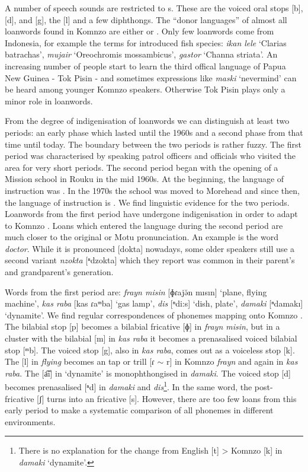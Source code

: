 A number of speech sounds are restricted to s. These are the voiced oral stops [b], [d], and [g], the   [l] and a few diphthongs. The ``donor languages'' of almost all loanwords found in Komnzo are either  or . Only few loanwords come from  Indonesia, for example the terms for introduced fish species: \emph{ikan lele} `Clarias batrachas', \emph{mujair} `Oreochromis mossambicus', \emph{gastor} `Channa striata'. An increasing number of people start to learn the third offical language of Papua New Guinea - Tok Pisin - and sometimes expressions like \emph{maski} `nevermind' can be heard among younger Komnzo speakers. Otherwise Tok Pisin plays only a minor role in loanwords.

From the degree of indigenisation of loanwords we can distinguish at least two periods: an early phase which lasted until the 1960s and a second phase from that time until today. The boundary between the two periods is rather fuzzy. The first period was characterised by  speaking patrol officers and officials who visited the area for very short periods. The second period began with the opening of a Mission school in Rouku in the mid 1960s. At the beginning, the language of instruction was . In the 1970s the school was moved to Morehead and since then, the language of instruction is . We find linguistic evidence for the two periods. Loanwords from the first period have undergone indigenisation in order to adapt to Komnzo . Loans which entered the language during the second period are much closer to the original  or Motu pronunciation. An example is the word \emph{doctor}. While it is pronounced [dokta] nowadays, some older speakers still use a second variant \emph{nzokta} [ⁿdzokta] which they report was common in their parent's and grandparent's generation.

Words from the first period are: \emph{frayn misin} [ɸɾajə̆n mısın] `plane, flying machine', \emph{kas raba} [kas ɾaᵐba] `gas lamp', \emph{dis} [ⁿdi:s] `dish, plate', \emph{damaki} [ⁿdamakı] `dynamite'. We find regular correspondences of  phonemes mapping onto Komnzo . The bilabial stop [p] becomes a bilabial fricative [ɸ] in \emph{frayn misin}, but in a cluster with the bilabial  [m] in \emph{kas raba} it becomes a prenasalised voiced bilabial stop [ᵐb]. The  voiced stop [g], also in \emph{kas raba}, comes out as a voiceless  stop [k]. The   [l] in  \emph{flying} becomes an  tap or trill [ɾ $\sim$ r] in Komnzo \emph{frayn} and again in \emph{kas raba}. The   [a͡i] in `dynamite' is monophthongised in \emph{damaki}. The voiced  stop [d] becomes prenasalised [ⁿd] in \emph{damaki} and \emph{dis}\footnote{There is no explanation for the change from English [t] > Komnzo [k] in \emph{damaki} `dynamite'.}. In the same word, the post- fricative [ʃ] turns into an  fricative [s]. However, there are too few loans from this early period to make a systematic comparison of all  phonemes in different environments.

